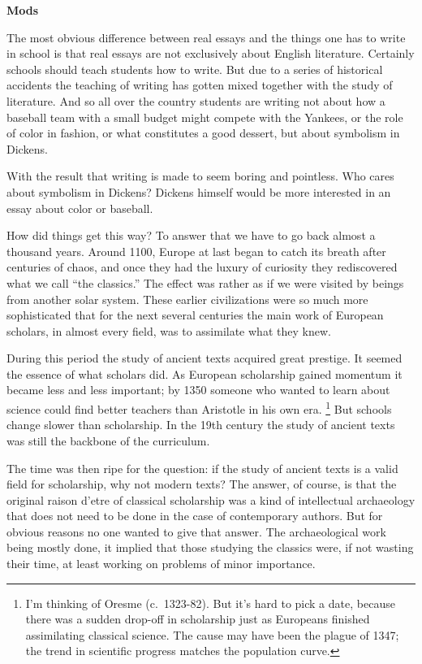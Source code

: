 \documentclass[12pt]{book}
\begin{document}
\textbf{Mods}

The most obvious difference between real essays and the things one has
to write in school is that real essays are not exclusively about English
literature. Certainly schools should teach students how to write. But
due to a series of historical accidents the teaching of writing has
gotten mixed together with the study of literature. And so all over the
country students are writing not about how a baseball team with a small
budget might compete with the Yankees, or the role of color in fashion,
or what constitutes a good dessert, but about symbolism in Dickens.

With the result that writing is made to seem boring and pointless. Who
cares about symbolism in Dickens? Dickens himself would be more
interested in an essay about color or baseball.

How did things get this way? To answer that we have to go back almost a
thousand years. Around 1100, Europe at last began to catch its breath
after centuries of chaos, and once they had the luxury of curiosity they
rediscovered what we call ``the classics.'' The effect was rather as if
we were visited by beings from another solar system. These earlier
civilizations were so much more sophisticated that for the next several
centuries the main work of European scholars, in almost every field, was
to assimilate what they knew.

During this period the study of ancient texts acquired great prestige.
It seemed the essence of what scholars did. As European scholarship
gained momentum it became less and less important; by 1350 someone who
wanted to learn about science could find better teachers than Aristotle
in his own era. \footnote{I'm thinking of Oresme (c.~1323-82). But it's hard to pick a
date, because there was a sudden drop-off in scholarship just as
Europeans finished assimilating classical science. The cause may have
been the plague of 1347; the trend in scientific progress matches the
population curve.} But schools change slower than scholarship. In
the 19th century the study of ancient texts was still the backbone of
the curriculum.

The time was then ripe for the question: if the study of ancient texts
is a valid field for scholarship, why not modern texts? The answer, of
course, is that the original raison d'etre of classical scholarship was
a kind of intellectual archaeology that does not need to be done in the
case of contemporary authors. But for obvious reasons no one wanted to
give that answer. The archaeological work being mostly done, it implied
that those studying the classics were, if not wasting their time, at
least working on problems of minor importance.
\end{document}
